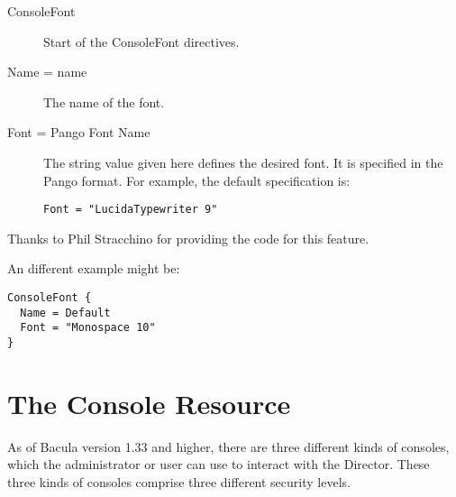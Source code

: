 \begin{description}

\item [ConsoleFont]
   Start of the ConsoleFont directives. 

\item [Name = \lt{}name\gt{}]
   The name of the font. 

\item [Font = \lt{}Pango Font Name\gt{}]
   The string value given here defines the desired font. It  is specified in the
   Pango format. For example, the default specification is: 

\footnotesize
\begin{verbatim}
Font = "LucidaTypewriter 9"
\end{verbatim}
\normalsize

\end{description}

Thanks to Phil Stracchino for providing the code for this feature. 

An different example might be: 

\footnotesize
\begin{verbatim}
ConsoleFont {
  Name = Default
  Font = "Monospace 10"
}
\end{verbatim}
\normalsize

\section{The Console Resource}
\label{ConsoleResource}

As of Bacula version 1.33 and higher, there are three different kinds of
consoles, which the administrator or user can use to interact with the
Director. These three kinds of consoles comprise three different security
levels. 

